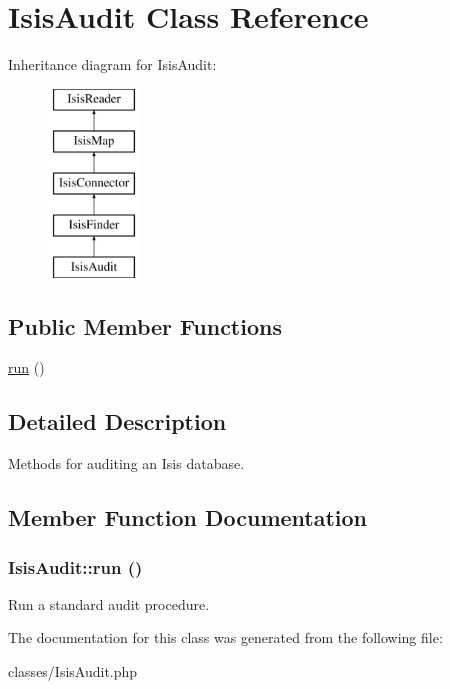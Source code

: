 \hypertarget{classIsisAudit}{
\section{IsisAudit Class Reference}
\label{classIsisAudit}
}
Inheritance diagram for IsisAudit:\begin{figure}[H]
\begin{center}
\leavevmode
\includegraphics[height=5cm]{classIsisAudit}
\end{center}
\end{figure}
\subsection*{Public Member Functions}
\begin{DoxyCompactItemize}
\item 
\hyperlink{classIsisAudit_a2fb1d5a12933f63f396188bc4229f671}{run} ()
\end{DoxyCompactItemize}


\subsection{Detailed Description}
Methods for auditing an Isis database. 

\subsection{Member Function Documentation}
\hypertarget{classIsisAudit_a2fb1d5a12933f63f396188bc4229f671}{
\subsubsection[{run}]{\setlength{\rightskip}{0pt plus 5cm}IsisAudit::run ()}}
\label{classIsisAudit_a2fb1d5a12933f63f396188bc4229f671}
Run a standard audit procedure. 

The documentation for this class was generated from the following file:\begin{DoxyCompactItemize}
\item 
classes/IsisAudit.php\end{DoxyCompactItemize}
